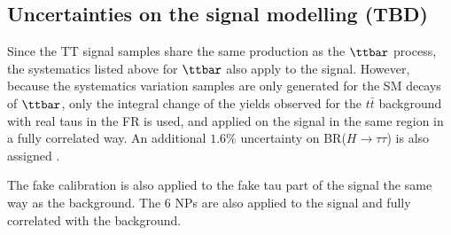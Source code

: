 \subsection{Uncertainties on the signal modelling (TBD)}

Since the TT signal samples share the same production as the $\ttbar$ process, the systematics listed above for $\ttbar$ also apply to the signal. However, because the systematics variation samples are only generated for the SM decays of $\ttbar$, only the integral change of the yields observed for the $t\bar{t}$ background with real taus in the FR is used, and applied on the signal in the same region in a fully correlated way. An additional $1.6\%$ uncertainty on BR($H\to\tau\tau$) is also assigned \cite{HiggsBR}.

The fake calibration is also applied to the fake tau part of the signal the same way as the background. The 6 NPs are also applied to the signal and fully correlated with the background.